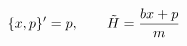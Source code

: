 \documentclass[preview]{standalone}
\begin{document}
\begin{align*}
\special{dvisvgm:raw <g id='unique000'>}\{x,p\}'=p,\qquad \tilde H=\frac{bx+p}{m}\special{dvisvgm:raw </g>}
\end{align*}
\end{document}
